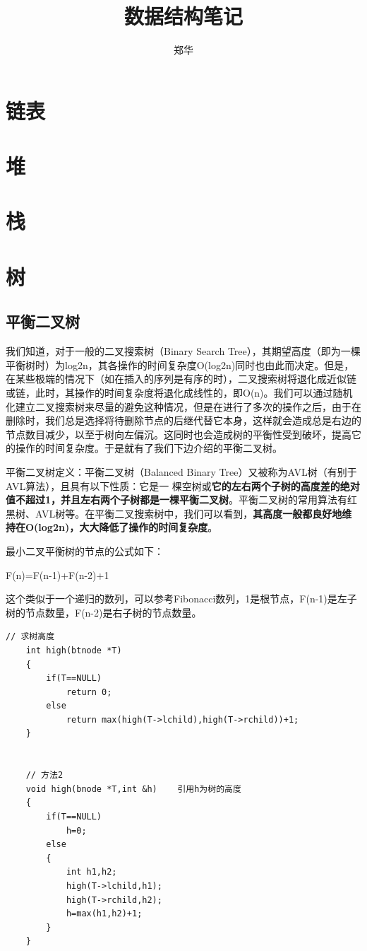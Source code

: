 \documentclass[UTF8,a4paper,12pt]{ctexbook}
\author{\kaishu 郑华}
\title{\heiti 数据结构笔记}
\begin{document}
 	\maketitle
 	\tableofcontents
 	
\chapter{链表}


\chapter{堆}


\chapter{栈}


\chapter{树}
	\section{平衡二叉树}
		我们知道，对于一般的二叉搜索树（Binary Search Tree），其期望高度（即为一棵平衡树时）为log2n，其各操作的时间复杂度O(log2n)同时也由此而决定。但是，在某些极端的情况下（如在插入的序列是有序的时），二叉搜索树将退化成近似链或链，此时，其操作的时间复杂度将退化成线性的，即O(n)。我们可以通过随机化建立二叉搜索树来尽量的避免这种情况，但是在进行了多次的操作之后，由于在删除时，我们总是选择将待删除节点的后继代替它本身，这样就会造成总是右边的节点数目减少，以至于树向左偏沉。这同时也会造成树的平衡性受到破坏，提高它的操作的时间复杂度。于是就有了我们下边介绍的平衡二叉树。
		
		平衡二叉树定义：平衡二叉树（Balanced Binary Tree）又被称为AVL树（有别于AVL算法），且具有以下性质：它是一 棵空树或\textbf{它的左右两个子树的高度差的绝对值不超过1，并且左右两个子树都是一棵平衡二叉树}。平衡二叉树的常用算法有红黑树、AVL树等。在平衡二叉搜索树中，我们可以看到，\textbf{其高度一般都良好地维持在O(log2n)，大大降低了操作的时间复杂度}。
		
		最小二叉平衡树的节点的公式如下：
		
		F(n)=F(n-1)+F(n-2)+1
		
		这个类似于一个递归的数列，可以参考Fibonacci数列，1是根节点，F(n-1)是左子树的节点数量，F(n-2)是右子树的节点数量。
			\begin{lstlisting}[frame = L, xleftmargin = .07\textwidth]
	// 求树高度
	int high(btnode *T)  
	{  
		if(T==NULL)  
			return 0;  
		else  
			return max(high(T->lchild),high(T->rchild))+1;  
	}  
	
	
	// 方法2
	void high(bnode *T,int &h)    引用h为树的高度  
	{  
		if(T==NULL)  
			h=0;  
		else  
		{  
			int h1,h2;  
			high(T->lchild,h1);  
			high(T->rchild,h2);  
			h=max(h1,h2)+1;  
		}  
	}  
			\end{lstlisting}
			
\end{document}
